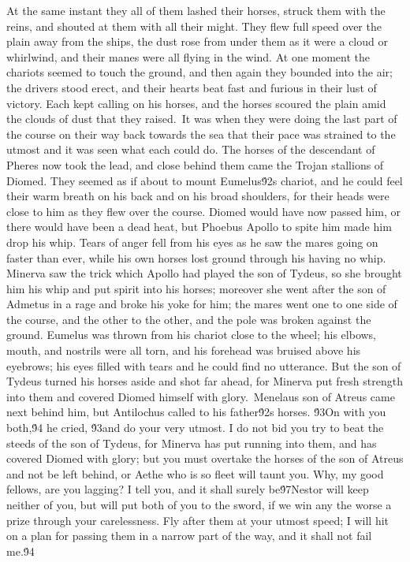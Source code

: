 {At the same instant they all of them lashed their horses, struck them with the reins, and shouted at them with all their might. They flew full speed over the plain away from the ships, the dust rose from under them as it were a cloud or whirlwind, and their manes were all flying in the wind. At one moment the chariots seemed to touch the ground, and then again they bounded into the air; the drivers stood erect, and their hearts beat fast and furious in their lust of victory. Each kept calling on his horses, and the horses scoured the plain amid the clouds of dust that they raised.\
It was when they were doing the last part of the course on their way back towards the sea that their pace was strained to the utmost and it was seen what each could do. The horses of the descendant of Pheres now took the lead, and close behind them came the Trojan stallions of Diomed. They seemed as if about to mount Eumelus\'92s chariot, and he could feel their warm breath on his back and on his broad shoulders, for their heads were close to him as they flew over the course. Diomed would have now passed him, or there would have been a dead heat, but Phoebus Apollo to spite him made him drop his whip. Tears of anger fell from his eyes as he saw the mares going on faster than ever, while his own horses lost ground through his having no whip. Minerva saw the trick which Apollo had played the son of Tydeus, so she brought him his whip and put spirit into his horses; moreover she went after the son of Admetus in a rage and broke his yoke for him; the mares went one to one side of the course, and the other to the other, and the pole was broken against the ground. Eumelus was thrown from his chariot close to the wheel; his elbows, mouth, and nostrils were all torn, and his forehead was bruised above his eyebrows; his eyes filled with tears and he could find no utterance. But the son of Tydeus turned his horses aside and shot far ahead, for Minerva put fresh strength into them and covered Diomed himself with glory.\
Menelaus son of Atreus came next behind him, but Antilochus called to his father\'92s horses. \'93On with you both,\'94 he cried, \'93and do your very utmost. I do not bid you try to beat the steeds of the son of Tydeus, for Minerva has put running into them, and has covered Diomed with glory; but you must overtake the horses of the son of Atreus and not be left behind, or Aethe who is so fleet will taunt you. Why, my good fellows, are you lagging? I tell you, and it shall surely be\'97Nestor will keep neither of you, but will put both of you to the sword, if we win any the worse a prize through your carelessness. Fly after them at your utmost speed; I will hit on a plan for passing them in a narrow part of the way, and it shall not fail me.\'94\
}
